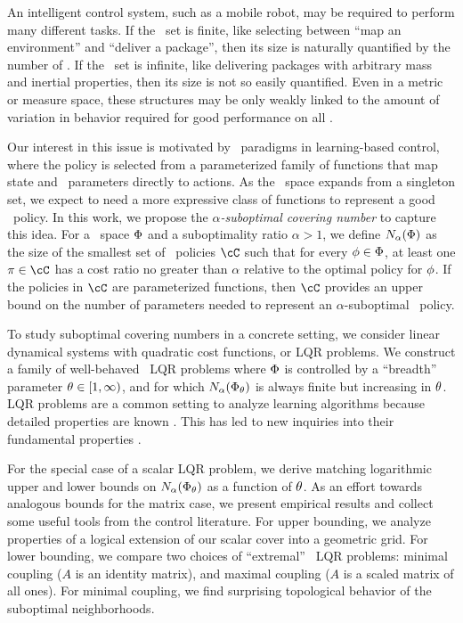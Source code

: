 An intelligent control system, such as a mobile robot, may be required to perform many different tasks.
If the \envword\ set is finite, like selecting between ``map an environment'' and ``deliver a package'',
then its size is naturally quantified by the number of \envwords.
If the \envword\ set is infinite, like delivering packages with arbitrary mass and inertial properties,
then its size is not so easily quantified.
Even in a metric or measure space,
these structures may be only weakly linked to the amount of variation in behavior
required for good performance on all \envwords.

Our interest in this issue is motivated by \multienv\ paradigms in learning-based control,
where the policy is selected from a parameterized family of functions
that map state and \envword\ parameters directly to actions.
As the \envword\ space expands from a singleton set,
we expect to need a more expressive class of functions
to represent a good \multienv\ policy.
In this work, we propose the 
\emph{$\alpha$-suboptimal covering number}
to capture this idea. %
For a \envword\ space $\Phi$
and a suboptimality ratio $\alpha > 1$,
we define $N_{\alpha}(\Phi)$ as
the size of the smallest set of \singleenv\ policies $\coveringset$ %
such that for every $\phi \in \Phi$, at least one $\pi \in \coveringset$
has a cost ratio no greater than $\alpha$ relative to the optimal policy for $\phi$.
If the policies in $\coveringset$ are parameterized functions,
then $\coveringset$ provides an upper bound on the number of parameters
needed to represent an $\alpha$-suboptimal \multienv\ policy.

To study suboptimal covering numbers in a concrete setting,
we consider linear dynamical systems
with quadratic cost functions, or LQR problems.
We construct a family of well-behaved \multienv\ LQR problems 
where $\Phi$ is controlled by a ``breadth'' parameter $\theta \in [1, \infty)$,
and for which
$N_{\alpha}(\Phi_\theta)$
is always finite but increasing in $\theta$.
LQR problems are a common setting to analyze learning algorithms because detailed properties are known \citep[for example]{fazel-global-lqr}.
This has led to new inquiries into their fundamental properties \citep{bu-topological-gains}.

For the special case of a scalar LQR problem,
we derive matching logarithmic upper and lower bounds on
$N_{\alpha}(\Phi_\theta)$
as a function of $\theta$.
As an effort towards analogous bounds for the matrix case,
we present empirical results
and collect some useful tools from the control literature.
For upper bounding, we analyze properties of a logical extension of our scalar cover into a geometric grid.
For lower bounding, we compare two choices of ``extremal''  \multienv\ LQR problems:
minimal coupling ($A$ is an identity matrix),
and maximal coupling ($A$ is a scaled matrix of all ones).
For minimal coupling, we find surprising topological behavior of the suboptimal neighborhoods.

